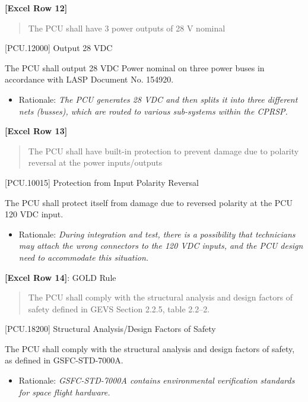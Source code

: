\textbf{[Excel Row 12]}

\begin{quote}
The PCU shall have 3 power outputs of 28 V nominal
\end{quote}

[PCU.12000] Output 28 VDC

The PCU shall output 28 VDC Power nominal on three power buses in accordance with LASP Document No. 154920.

\begin{itemize}
\item{} Rationale: \emph{The PCU generates 28 VDC and then splits it into three different nets (busses), which are routed to various sub-systems within the CPRSP.}

\end{itemize}

\textbf{[Excel Row 13]}

\begin{quote}
The PCU shall have built-in protection to prevent damage due to polarity reversal at the power inputs\slash outputs
\end{quote}

[PCU.10015] Protection from Input Polarity Reversal

The PCU shall protect itself from damage due to reversed polarity at the PCU 120 VDC input.

\begin{itemize}
\item{} Rationale: \emph{During integration and test, there is a possibility that technicians may attach the wrong connectors to the 120 VDC inputs, and the PCU design need to accommodate this situation.}

\end{itemize}

\textbf{[Excel Row 14]}: GOLD Rule

\begin{quote}
The PCU shall comply with the structural analysis and design factors of safety defined in GEVS Section 2.2.5, table 2.2--2.
\end{quote}

[PCU.18200] Structural Analysis\slash Design Factors of Safety

The PCU shall comply with the structural analysis and design factors of safety, as defined in GSFC-STD-7000A.

\begin{itemize}
\item{} Rationale: \emph{GSFC-STD-7000A contains environmental verification standards for space flight hardware.}

\end{itemize}

